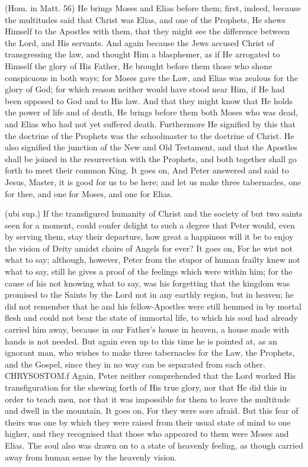  (Hom. in Matt. 56) He brings Moses and Elias before them; first, indeed, because the multitudes said that Christ was Elias, and one of the Prophets, He shews Himself to the Apostles with them, that they might see the difference between the Lord, and His servants. And again because the Jews accused Christ of transgressing the law, and thought Him a blasphemer, as if He arrogated to Himself the glory of His Father, He brought before them those who shone conspicuous in both ways; for Moses gave the Law, and Elias was zealous for the glory of God; for which reason neither would have stood near Him, if He had been opposed to God and to His law. And that they might know that He holds the power of life and of death, He brings before them both Moses who was dead, and Elias who had not yet suffered death. Furthermore He signified by this that the doctrine of the Prophets was the schoolmaster to the doctrine of Christ. He also signified the junction of the New and Old Testament, and that the Apostles shall be joined in the resurrection with the Prophets, and both together shall go forth to meet their common King. It goes on, And Peter answered and said to Jesus, Master, it is good for us to be here; and let us make three tabernacles, one for thee, and one for Moses, and one for Elias.

 (ubi sup.) If the transfigured humanity of Christ and the society of but two saints seen for a moment, could confer delight to such a degree that Peter would, even by serving them, stay their departure, how great a happiness will it be to enjoy the vision of Deity amidst choirs of Angels for ever? It goes on, For he wist not what to say; although, however, Peter from the stupor of human frailty knew not what to say, still he gives a proof of the feelings which were within him; for the cause of his not knowing what to say, was his forgetting that the kingdom was promised to the Saints by the Lord not in any earthly region, but in heaven; he did not remember that he and his fellow-Apostles were still hemmed in by mortal flesh and could not bear the state of immortal life, to which his soul had already carried him away, because in our Father’s house in heaven, a house made with hands is not needed. But again even up to this time he is pointed at, as an ignorant man, who wishes to make three tabernacles for the Law, the Prophets, and the Gospel, since they in no way can be separated from each other. CHRYSOSTOM.f Again, Peter neither comprehended that the Lord worked His transfiguration for the shewing forth of His true glory, nor that He did this in order to teach men, nor that it was impossible for them to leave the multitude and dwell in the mountain. It goes on, For they were sore afraid. But this fear of theirs was one by which they were raised from their usual state of mind to one higher, and they recognised that those who appeared to them were Moses and Elias. The soul also was drawn on to a state of heavenly feeling, as though carried away from human sense by the heavenly vision.

